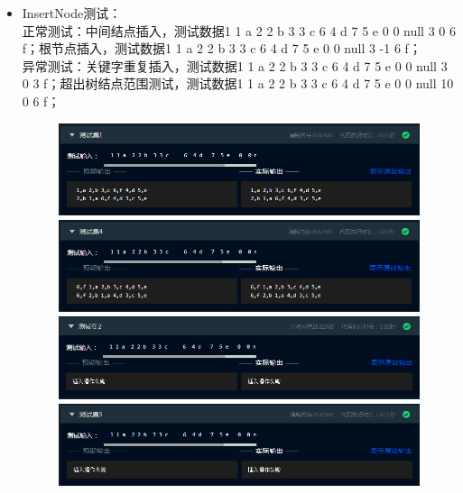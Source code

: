 \documentclass[supercite]{Experimental_Report}
\theoremstyle{definition}
\begin{document}
\begin{itemize}
	\item InsertNode测试：\\正常测试：中间结点插入，测试数据1 1 a  2 2 b  3 3 c     6  4 d   7  5 e   0  0 null 3 0 6 f；根节点插入，测试数据1 1 a  2 2 b  3 3 c     6  4 d   7  5 e   0  0 null 3 -1 6 f；\\
	      异常测试：关键字重复插入，测试数据1 1 a  2 2 b  3 3 c 6  4 d   7  5 e   0  0 null 3 0 3 f；超出树结点范围测试，测试数据1 1 a  2 2 b  3 3 c  6  4 d  7  5 e   0  0 null 10 0 6 f；
	      \begin{figure}[htbp]
		      \centering
		      \begin{minipage}{0.9\linewidth}
			      \centering
			      \includegraphics[width=0.9\linewidth]{images/test-73.png}
		      \end{minipage}
		      \begin{minipage}{0.9\linewidth}
			      \centering
			      \includegraphics[width=0.9\linewidth]{images/test-76.png}
		      \end{minipage}
		      \begin{minipage}{0.9\linewidth}
			      \centering
			      \includegraphics[width=0.9\linewidth]{images/test-74.png}
		      \end{minipage}
		      \begin{minipage}{0.9\linewidth}
			      \centering
			      \includegraphics[width=0.9\linewidth]{images/test-75.png}

\end{minipage}
\end{figure}
\end{itemize}
\end{document}
